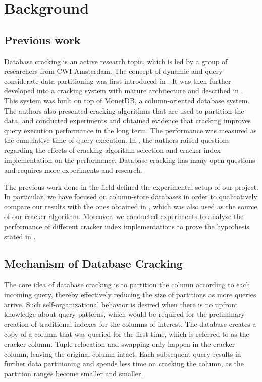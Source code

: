 \section{Background}
\label{sec:background}
\subsection{Previous work}
Database cracking is an active research topic, which is led by a group of researchers from CWI Amsterdam. The concept of dynamic and query-considerate data partitioning was first introduced in \cite{kersten_2005}. It was then further developed into a cracking system with mature architecture and described in \cite{idreos_2007}. This system was built on top of MonetDB, a column-oriented database system. The authors also presented cracking algorithms that are used to partition the data, and conducted experiments and obtained evidence that cracking improves query execution performance in the long term. The performance was measured as the cumulative time of query execution. In \cite{schuhknecht_2014}, the authors raised questions regarding the effects of cracking algorithm selection and cracker index implementation on the performance. Database cracking has many open questions and requires more experiments and research.

The previous work done in the field defined the experimental setup of our project. In particular, we have focused on column-store databases in order to qualitatively compare our results with the  ones obtained in \cite{idreos_2007}, which was also used as the source of our cracker algorithm. Moreover, we conducted experiments to analyze the performance of different cracker index implementations to prove the hypothesis stated in \cite{schuhknecht_2014}.

\subsection{Mechanism of Database Cracking}
The core idea of database cracking is to partition the column according to each incoming query, thereby effectively reducing the size of partitions as more queries arrive. Such self-organizational behavior is desired when there is no upfront knowledge about query patterns, which would be required for the preliminary creation of traditional indexes for the columns of interest. The database creates a copy of a column that was queried for the first time, which is referred to as the cracker column. Tuple relocation and swapping only happen in the cracker column, leaving the original column intact. Each subsequent query results in further data partitioning and spends less time on cracking the column, as the partition ranges become smaller and smaller.


